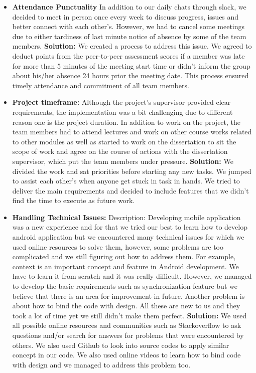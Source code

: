 \documentclass{article}
\begin{document}
\begin{itemize}
\item \textbf{Attendance Punctuality} In addition to our daily chats through slack, we decided to meet in person once every week to discuss progress, issues and better connect with each other’s. However, we had to cancel some meetings due to either tardiness of last minute notice of absence by some of the team members.
\textbf{Solution:} We created a process to address this issue. We agreed to deduct points from the peer-to-peer assessment scores if a member was late for more than 5 minutes of the meeting start time or didn’t inform the group about his/her absence 24 hours prior the meeting date. This process ensured timely attendance and commitment of all team members.
\item \textbf{Project timeframe:} Although the project’s supervisor provided clear requirements, the implementation was a bit challenging due to different reason one is the project duration. In addition to work on the project, the team members had to attend lectures and work on other course works related to other modules as well as started to work on the dissertation to sit the scope of work and agree on the course of actions with the dissertation supervisor, which put the team members under pressure.
\textbf{Solution:} We divided the work and sat priorities before starting any new tasks. We jumped to assist each other’s when anyone get stuck in task in hands. We tried to deliver the main requirements and decided to include features that we didn’t find the time to execute as future work.
\item \textbf{Handling Technical Issues:} Description: Developing mobile application was a new experience and for that we tried our best to learn how to develop android application but we encountered many technical issues for which we used online resources to solve them, however, some problems are too complicated and we still figuring out how to address them. For example, context is an important concept and feature in Android development. We have to learn it from scratch and it was really difficult. However, we managed to develop the basic requirements such as synchronization feature but we believe that there is an area for improvement in future.
Another problem is about how to bind the code with design. All these are new to us and they took a lot of time yet we still didn’t make them perfect.
\textbf{Solution:} We used all possible online resources and communities such as Stackoverflow to ask questions and/or search for answers for problems that were encountered by others. We also used Github to look into source codes to apply similar concept in our code. We also used online videos to learn how to bind code with design and we managed to address this problem too.

\end{itemize}
\end{document}
